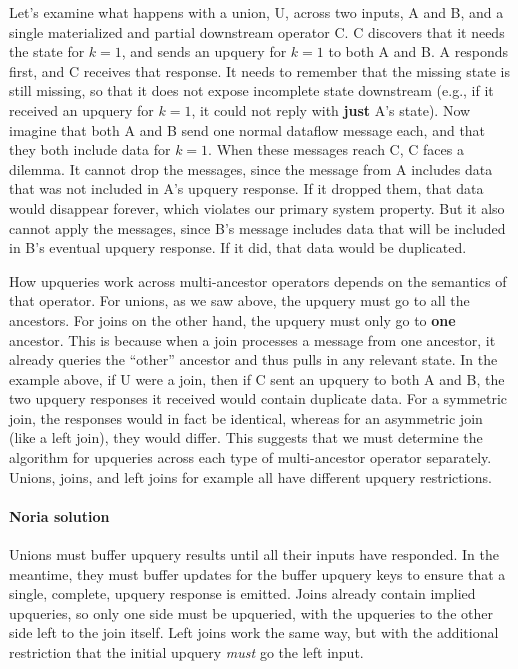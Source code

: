 Let's examine what happens with a union, U, across two inputs, A and B,
and a single materialized and partial downstream operator C. C discovers
that it needs the state for $k = 1$, and sends an upquery for $k = 1$ to
both A and B. A responds first, and C receives that response. It needs
to remember that the missing state is still missing, so that it does not
expose incomplete state downstream (e.g., if it received an upquery for
$k = 1$, it could not reply with \textbf{just} A's state). Now imagine that
both A and B send one normal dataflow message each, and that they both
include data for $k = 1$. When these messages reach C, C faces a
dilemma. It cannot drop the messages, since the message from A includes
data that was not included in A's upquery response. If it dropped them,
that data would disappear forever, which violates our primary system
property. But it also cannot apply the messages, since B's message
includes data that will be included in B's eventual upquery response. If
it did, that data would be duplicated.

How upqueries work across multi-ancestor operators depends on the
semantics of that operator. For unions, as we saw above, the upquery
must go to all the ancestors. For joins on the other hand, the upquery
must only go to \textbf{one} ancestor. This is because when a join processes
a message from one ancestor, it already queries the ``other'' ancestor and
thus pulls in any relevant state. In the example above, if U were a
join, then if C sent an upquery to both A and B, the two upquery
responses it received would contain duplicate data. For a symmetric
join, the responses would in fact be identical, whereas for an
asymmetric join (like a left join), they would differ. This suggests
that we must determine the algorithm for upqueries across each type of
multi-ancestor operator separately. Unions, joins, and left joins for
example all have different upquery restrictions.

\paragraph{Noria solution}
Unions must buffer upquery results until all their inputs have responded. In the
meantime, they must buffer updates for the buffer upquery keys to ensure that a
single, complete, upquery response is emitted. Joins already contain implied
upqueries, so only one side must be upqueried, with the upqueries to the other
side left to the join itself. Left joins work the same way, but with the
additional restriction that the initial upquery \emph{must} go the left input.

